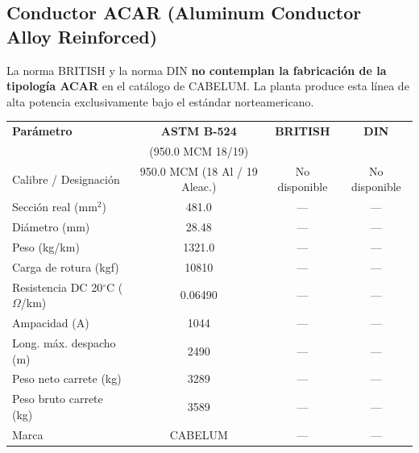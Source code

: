 \documentclass[12pt,a4paper]{article}
\begin{document}
\begin{landscape}
\subsection{Conductor ACAR (Aluminum Conductor Alloy Reinforced)}

La norma BRITISH y la norma DIN \textbf{no contemplan la fabricación de la
tipología ACAR} en el catálogo de CABELUM. La planta produce esta línea de
alta potencia exclusivamente bajo el estándar norteamericano.
\begin{center}
\begin{tabular}{p{4cm}c|c|c}
\toprule
\textbf{Parámetro} & \textbf{ASTM B-524} & \textbf{BRITISH} & \textbf{DIN} \\
& (950.0 MCM 18/19) & & \\
\midrule
Calibre / Designación & 950.0 MCM (18 Al / 19 Aleac.) & No disponible & No disponible \\
\midrule
Sección real (mm$^2$) & 481.0 & --- & --- \\
\midrule
Diámetro (mm) & 28.48 & --- & --- \\
\midrule
Peso (kg/km) & 1321.0 & --- & --- \\
\midrule
Carga de rotura (kgf) & 10810 & --- & --- \\
\midrule
Resistencia DC 20$^\circ$C ($\Omega$/km) & 0.06490 & --- & --- \\
\midrule
Ampacidad (A) & 1044 & --- & --- \\
\midrule
Long. máx. despacho (m) & 2490 & --- & --- \\
\midrule
Peso neto carrete (kg) & 3289 & --- & --- \\
\midrule
Peso bruto carrete (kg) & 3589 & --- & --- \\
\midrule
Marca & CABELUM & --- & --- \\
\bottomrule
\end{tabular}
\end{center}
\end{landscape}
\end{document}
